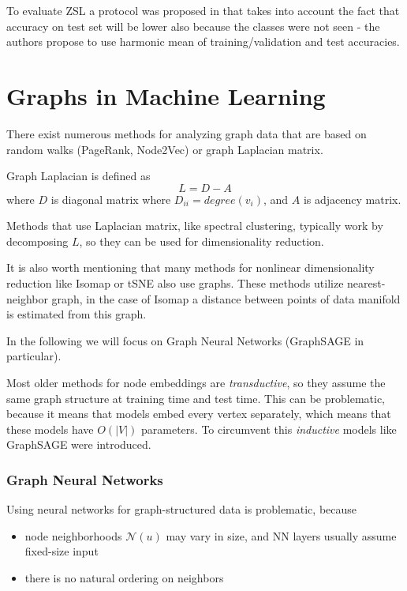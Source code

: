 \documentclass[longabstract,mgr,english]{iithesis}
\begin{document}
To evaluate ZSL a protocol was proposed in \cite{zsl_good_bad} that takes into account the fact that accuracy on test set will be lower also because the classes were not seen - the authors propose to use harmonic mean of training/validation and test accuracies.



\section{Graphs in Machine Learning}

There exist numerous methods for analyzing graph data that are based on random walks (PageRank, Node2Vec) or graph Laplacian matrix.

Graph Laplacian is defined as $$L = D - A$$ where \(D\) is diagonal matrix where \(D_{ii} = degree(v_i)\), and \(A\) is adjacency matrix.

Methods that use Laplacian matrix, like spectral clustering, typically work by decomposing \(L\), so they can be used for dimensionality reduction.

It is also worth mentioning that many methods for nonlinear dimensionality reduction like Isomap or tSNE also use graphs.
These methods utilize nearest-neighbor graph, in the case of Isomap a distance between points of data manifold is estimated from this graph.

In the following we will focus on Graph Neural Networks (GraphSAGE in particular).

Most older methods for node embeddings are \emph{transductive}, so they assume the same graph structure at training time and test time.
This can be problematic, because it means that models embed every vertex separately, which means that these models have \(O(|V|)\) parameters.
To circumvent this \emph{inductive} models like GraphSAGE were introduced.

\subsubsection{Graph Neural Networks}

Using neural networks for graph-structured data is problematic, because
\begin{itemize}
\item node neighborhoods \(\mathcal{N}(u)\) may vary in size, and NN layers usually assume fixed-size input
\item there is no natural ordering on neighbors
\end{itemize}
\end{document}
